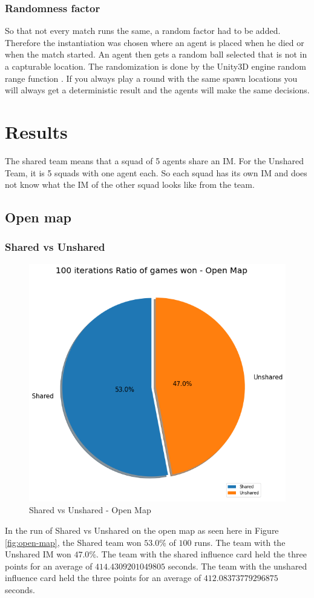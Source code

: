 \documentclass[]{report}
\begin{document}
		\subsection{Randomness factor} \label{ssec:rf}
		So that not every match runs the same, a random factor had to be added. Therefore the instantiation was chosen where an agent is placed when he died or when the match started. An agent then gets a random ball selected that is not in a capturable location. The randomization is done by the Unity3D engine random range function \citep{technologiesUnityRandomRange}. If you always play a round with the same spawn locations you will always get a deterministic result and the agents will make the same decisions.
		
		\chapter{Results} \label{results}
		The shared team means that a squad of 5 agents share an \ac{IM}. For the Unshared Team, it is 5 squads with one agent each. So each squad has its own \ac{IM} and does not know what the \ac{IM} of the other squad looks like from the team. 
		\section{Open map}
		\subsection{Shared vs Unshared}
		\begin{figure}[h!]
			\centering
			\includegraphics[width=0.9\linewidth]{"Images/100 Games Shared vs Unshared Open Map"}
			\caption[Shared vs Unshared - Open Map]{Shared vs Unshared - Open Map}
			\label{fig:100-games-shared-vs-unshared-open-map}
		\end{figure}
	In the run of Shared vs Unshared on the open map as seen here in Figure \ref{fig:open-map}, the Shared team won $53.0\%$ of $100$ runs. The team with the Unshared \ac{IM} won $47.0\%$. The team with the shared influence card held the three points for an average of $414.4309201049805$ seconds. The team with the unshared influence card held the three points for an average of $412.08373779296875$ seconds.
		
\end{document}
